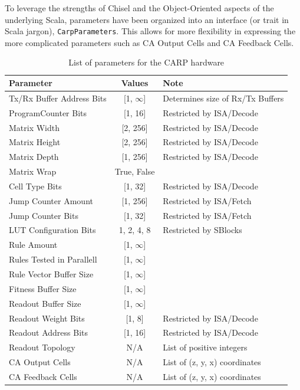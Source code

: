 To leverage the strengths of Chisel and the Object-Oriented aspects of the
underlying Scala, parameters have been organized into an interface (or trait in
Scala jargon), \texttt{CarpParameters}. This allows for more flexibility in
expressing the more complicated parameters such as CA Output Cells and CA
Feedback Cells.

\renewcommand{\arraystretch}{1.2}
\begin{table}[ht]
    \begin{tabular}{l|c|l}
    Parameter                 & Values      & Note                             \\ \hline
    Tx/Rx Buffer Address Bits & [1, $\infty$]    & Determines size of Rx/Tx Buffers \\
    ProgramCounter Bits       & [1, 16]     & Restricted by ISA/Decode         \\
    Matrix Width              & [2, 256]    & Restricted by ISA/Decode         \\
    Matrix Height             & [2, 256]    & Restricted by ISA/Decode         \\
    Matrix Depth              & [1, 256]    & Restricted by ISA/Decode         \\
    Matrix Wrap               & True, False & ~                                \\
    Cell Type Bits            & [1, 32]     & Restricted by ISA/Decode         \\
    Jump Counter Amount       & [1, 256]    & Restricted by ISA/Fetch          \\
    Jump Counter Bits         & [1, 32]     & Restricted by ISA/Fetch          \\
    LUT Configuration Bits    & 1, 2, 4, 8  & Restricted by SBlocks            \\
    Rule Amount               & [1, $\infty$]    & ~                                \\
    Rules Tested in Parallell & [1, $\infty$]    & ~                                \\
    Rule Vector Buffer Size   & [1, $\infty$]    & ~                                \\
    Fitness Buffer Size       & [1, $\infty$]    & ~                                \\
    Readout Buffer Size       & [1, $\infty$]    & ~                                \\
    Readout Weight Bits       & [1,  8]     & Restricted by ISA/Decode         \\
    Readout Address Bits      & [1, 16]     & Restricted by ISA/Decode         \\
    Readout Topology          & N/A         & List of positive integers                  \\
    CA Output Cells           & N/A         & List of (z, y, x) coordinates    \\
    CA Feedback Cells         & N/A         & List of (z, y, x) coordinates    \\
    \end{tabular}
    \caption{List of parameters for the CARP hardware}
    \label{tbl:parameters}
\end{table}

